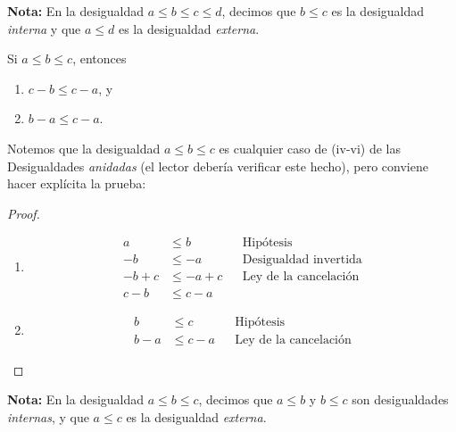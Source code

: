 \begin{enumerate}[label=\alph*)]
  \textbf{Nota:} En la desigualdad $a\leq b\leq c\leq d$, decimos que $b\leq c$ es la desigualdad \textit{interna} y que $a\leq d$ es la desigualdad \textit{externa}.
  
   Si $a\leq b \leq c$, entonces
  \begin{enumerate}[label=\roman*)]
    \item $c-b \leq c - a$, y
    \item $b - a \leq c - a$.
  \end{enumerate}
  Notemos que la desigualdad $a\leq b \leq c$ es cualquier caso de (iv-vi) de las Desigualdades \textit{anidadas} (el lector debería verificar este hecho), pero conviene hacer explícita la prueba:
  \begin{proof}\leavevmode
    \begin{enumerate}[label=\roman*)]
      \item \begin{align*}
        a &\leq b && \text{Hipótesis}\\
        -b &\leq -a && \text{Desigualdad invertida}\\
        -b + c &\leq -a + c && \text{Ley de la cancelación}\\
        c - b &\leq c- a
      \end{align*}
      \item \begin{align*}
        b &\leq c&& \text{Hipótesis}\\
        b - a &\leq c - a && \text{Ley de la cancelación}
      \end{align*}
    \end{enumerate}
  \end{proof}
  
  \textbf{Nota:} En la desigualdad $a\leq b \leq c$, decimos que $a\leq b$ y $b\leq c$ son desigualdades \textit{internas}, y que $a\leq c$ es la desigualdad \textit{externa}.
  

\end{enumerate}

